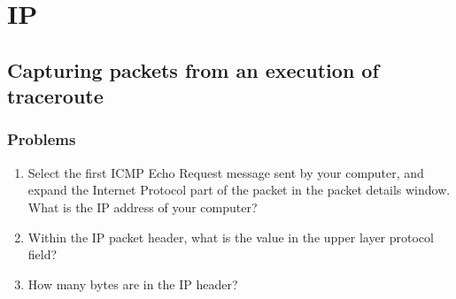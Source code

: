 \section{IP}
\subsection{Capturing packets from an execution of traceroute}
    \subsubsection*{Problems}
    \begin{enumerate}[label=\bfseries Problem \arabic*:,leftmargin=*,labelindent=1em]
        \item Select the first ICMP Echo Request message sent by your computer, 
        and expand the Internet Protocol part of the packet in the packet details window.
        What is the IP address of your computer?\\[0.2mm]
        \soln
        \item Within the IP packet header, what is the value in the upper layer protocol field?\\[0.2mm]
        \soln
        \item How many bytes are in the IP header?\\[0.2mm]
        \soln

\end{enumerate}
